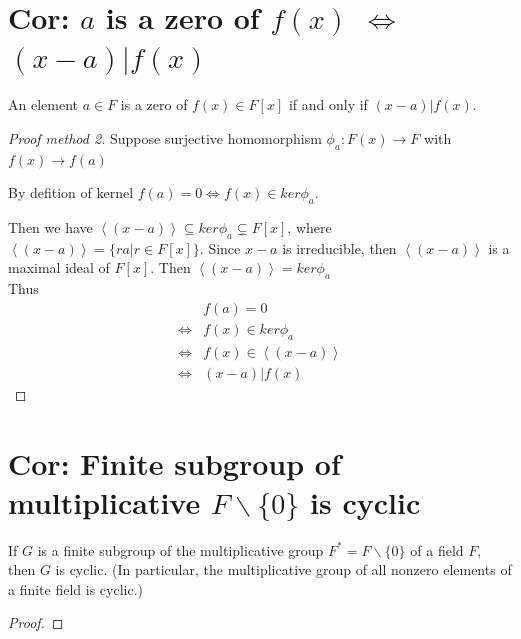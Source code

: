 \documentclass[11pt]{elegantbook}
\begin{document}
\section{Cor: $a$ is a zero of $f(x)$ $\Leftrightarrow$ $(x-a)|f(x)$}
\begin{corollary}
    An element $a \in F$ is a zero of $f(x) \in F[x]$ if and only if $(x - a)|f(x)$.
\end{corollary}
\begin{proof}[Proof method 2]
    Suppose surjective homomorphism $\phi_a:F(x) \rightarrow F$ with $f(x) \rightarrow	f(a)$

    By defition of kernel $f(a)=0\Leftrightarrow f(x)\in ker \phi_a$.

    Then we have $\left\langle (x-a)\right\rangle\subseteq ker\phi_a\subsetneq F[x]$, where $\left\langle (x-a)\right\rangle=\{ra|r\in F[x]\}$. Since $x-a$ is irreducible, then $\left\langle (x-a)\right\rangle$ is a maximal ideal of $F[x]$. Then $\left\langle (x-a)\right\rangle=ker\phi_a$\\
    Thus
    \begin{equation}
        \begin{aligned}
            &f(a)=0\\
            \Leftrightarrow& f(x)\in ker\phi_a\\
            \Leftrightarrow& f(x)\in \left\langle (x-a)\right\rangle\\
            \Leftrightarrow& (x-a)|f(x)
        \end{aligned}
        \nonumber
    \end{equation}
\end{proof}

\section{Cor: Finite subgroup of multiplicative $F\backslash \{0\}$ is cyclic}
\begin{corollary}
    If $G$ is a finite subgroup of the multiplicative group $F^*=F\backslash \{0\}$ of a field $F$, then $G$ is cyclic.
    (In particular, the multiplicative group of all nonzero elements of a finite field is cyclic.)
\end{corollary}
\begin{proof}

\end{proof}
\end{document}

